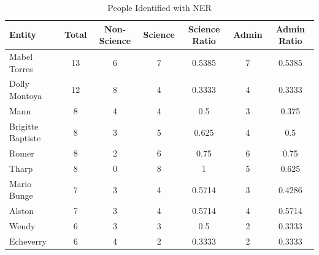 \documentclass[11pt,                                                            
 superscriptaddress,twoside,
 amsmath,amssymb,
 aps, physrev
]{revtex4-2}
\begin{document}
\begin{table}[H]
	\centering
	\caption{People Identified with NER}
	\label{tab:ner_people}
	\begin{tabular}{lcccccc}
		\hline
		\textbf{Entity} & \textbf{Total} & \textbf{Non-Science} & \textbf{Science} & \textbf{Science Ratio} & \textbf{Admin} & \textbf{Admin Ratio} \\
		\hline
		Mabel Torres      & 13 & 6 & 7 & 0.5385 & 7 & 0.5385 \\
		Dolly Montoya     & 12 & 8 & 4 & 0.3333 & 4 & 0.3333 \\
		Mann              & 8  & 4 & 4 & 0.5    & 3 & 0.375  \\
		Brigitte Baptiste & 8  & 3 & 5 & 0.625  & 4 & 0.5    \\
		Romer             & 8  & 2 & 6 & 0.75   & 6 & 0.75   \\
		Tharp             & 8  & 0 & 8 & 1      & 5 & 0.625  \\
		Mario Bunge       & 7  & 3 & 4 & 0.5714 & 3 & 0.4286 \\
		Alston            & 7  & 3 & 4 & 0.5714 & 4 & 0.5714 \\
		Wendy             & 6  & 3 & 3 & 0.5    & 2 & 0.3333 \\
		Echeverry         & 6  & 4 & 2 & 0.3333 & 2 & 0.3333 \\
		\hline
	\end{tabular}
\end{table}
\end{document}
